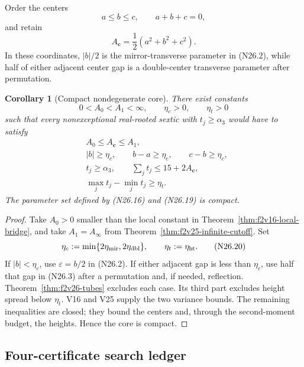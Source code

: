 \documentclass[11pt]{article}
\newtheorem{corollary}[theorem]{Corollary}
\theoremstyle{definition}
\theoremstyle{remark}
\begin{document}
Order the centers
\[
 a\leq b\leq c,\qquad a+b+c=0,
 \tag{N26.16}
\]
and retain
\[
 A_{\bm c}=\frac12(a^2+b^2+c^2).
 \tag{N26.17}
\]
In these coordinates, \(|b|/2\) is the mirror-transverse parameter in
\textup{(N26.2)}, while half of either adjacent center gap is a
double-center transverse parameter after permutation.

\begin{corollary}[Compact nondegenerate core]
\label{cor:f2v26-core}
There exist constants
\[
 0<A_0<A_1<\infty,\qquad
 \eta_c>0,\qquad \eta_t>0
 \tag{N26.18}
\]
such that every nonexceptional real-rooted sextic with
\(t_j\geq\alpha_3\) would have to satisfy
\[
\begin{aligned}
 &A_0\leq A_{\bm c}\leq A_1,\\
 &|b|\geq\eta_c,\qquad
 b-a\geq\eta_c,\qquad c-b\geq\eta_c,\\
 &t_j\geq\alpha_3,\qquad
 \sum_jt_j\leq15+2A_{\bm c},\\
 &\max_jt_j-\min_jt_j\geq\eta_t.
\end{aligned}
\tag{N26.19}
\]
The parameter set defined by \textup{(N26.16)} and
\textup{(N26.19)} is compact.
\end{corollary}

\begin{proof}
Take \(A_0>0\) smaller than the local constant in
Theorem~\ref{thm:f2v16-local-bridge}, and take
\(A_1=A_\infty\) from Theorem~\ref{thm:f2v25-infinite-cutoff}.
Set
\[
 \eta_c:=\min\{2\eta_{\rm mir},2\eta_{\rm dbl}\},
 \qquad \eta_t:=\eta_{\rm ht}.
 \tag{N26.20}
\]
If \(|b|<\eta_c\), use
\(\varepsilon=b/2\) in \textup{(N26.2)}.  If either adjacent gap is
less than \(\eta_c\), use half that gap in
\textup{(N26.3)} after a permutation and, if needed, reflection.
Theorem~\ref{thm:f2v26-tubes} excludes each case.  Its third part excludes
height spread below \(\eta_t\).  V16 and V25 supply the two variance
bounds.  The remaining inequalities are closed; they bound the centers
and, through the second-moment budget, the heights.  Hence the core is
compact.
\end{proof}

\subsection{Four-certificate search ledger}
\label{subsec:f2v26-search}
\end{document}
